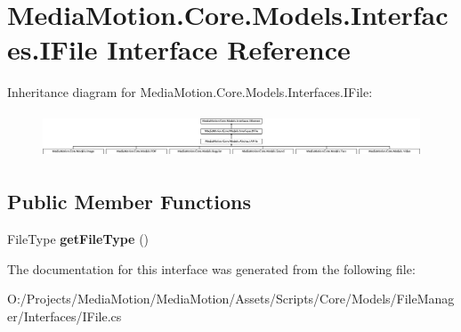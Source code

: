 \hypertarget{interface_media_motion_1_1_core_1_1_models_1_1_interfaces_1_1_i_file}{\section{Media\+Motion.\+Core.\+Models.\+Interfaces.\+I\+File Interface Reference}
\label{interface_media_motion_1_1_core_1_1_models_1_1_interfaces_1_1_i_file}
}
Inheritance diagram for Media\+Motion.\+Core.\+Models.\+Interfaces.\+I\+File\+:\begin{figure}[H]
\begin{center}
\leavevmode
\includegraphics[height=1.328588cm]{interface_media_motion_1_1_core_1_1_models_1_1_interfaces_1_1_i_file}
\end{center}
\end{figure}
\subsection*{Public Member Functions}
\begin{DoxyCompactItemize}
\item 
\hypertarget{interface_media_motion_1_1_core_1_1_models_1_1_interfaces_1_1_i_file_acab39ebbbb6eae529e9413458470d342}{File\+Type {\bfseries get\+File\+Type} ()}\label{interface_media_motion_1_1_core_1_1_models_1_1_interfaces_1_1_i_file_acab39ebbbb6eae529e9413458470d342}

\end{DoxyCompactItemize}


The documentation for this interface was generated from the following file\+:\begin{DoxyCompactItemize}
\item 
O\+:/\+Projects/\+Media\+Motion/\+Media\+Motion/\+Assets/\+Scripts/\+Core/\+Models/\+File\+Manager/\+Interfaces/I\+File.\+cs\end{DoxyCompactItemize}
